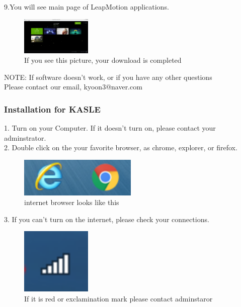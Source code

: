 \documentclass[10pt,journal,compsoc]{IEEEtran}
\begin{document}
9.You will see main page of LeapMotion applications.
\begin{figure}[H]
\centering
\includegraphics[width=0.3\textwidth]{Download4.png}
{\caption*{If you see this picture, your download is completed }}
\end{figure}

NOTE: If software doesn't work, or if you have any other questions \\
Please contact our email, kyoon3@naver.com\\
\subsubsection{Installation for KASLE}
1. Turn on your Computer. If it doesn't turn on, please contact your adminstrator.\\
2. Double click on the your favorite browser, as chrome, explorer, or firefox.\\ 

\begin{figure}[H]
\centering
\includegraphics[width=0.5\textwidth]{Internet.png}
{\caption*{internet browser looks like this}}
\end{figure}

3. If you can't turn on the internet, please check your connections.\\ 

\begin{figure}[H]
\centering
\includegraphics[width=0.3\textwidth]{Connection.png}
{\caption*{If it is red or exclamination mark
		  please contact adminstaror }}
\end{figure}
\end{document}
